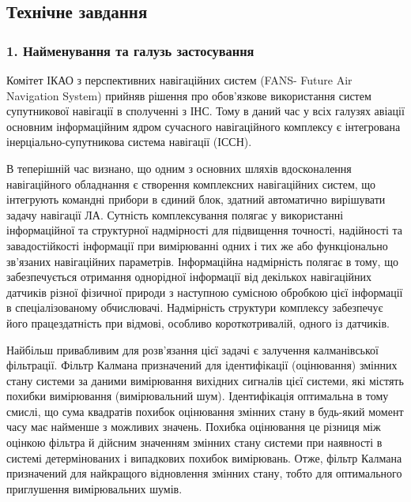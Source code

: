 % 
% 
% 
% 
% 


\subsection*{Технічне завдання}

\subsubsection*{1. Найменування та галузь застосування}
Комітет ІКАО з перспективних навігаційних систем (FANS- Future Air Navigation System) прийняв 
рішення про обов'язкове використання систем супутникової навігації в сполученні з ІНС. Тому в 
даний час у всіх галузях авіації основним інформаційним ядром сучасного навігаційного комплексу 
є інтегрована інерціально-супутникова система навігації (ІССН).

В теперішній час визнано, що одним з основних шляхів вдосконалення навігаційного обладнання 
є створення комплексних навігаційних систем, що інтегрують  командні прибори в єдиний блок, 
здатний автоматично вирішувати задачу навігації ЛА. Сутність комплексування полягає у 
використанні інформаційної та структурної надмірності для підвищення точності, надійності 
та завадостійкості інформації при вимірюванні одних і тих же або функціонально зв’язаних 
навігаційних параметрів. Інформаційна надмірність полягає в тому, що забезпечується отримання 
однорідної інформації від декількох навігаційних датчиків різної фізичної природи з наступною 
сумісною обробкою цієї інформації в спеціалізованому обчислювачі. Надмірність структури 
комплексу забезпечує його працездатність при відмові, особливо короткотривалій, одного із датчиків. 


Найбільш привабливим для розв’язання цієї задачі є залучення калманівської фільтрації. 
Фільтр Калмана призначений для ідентифікації (оцінювання) змінних стану системи за даними 
вимірювання вихідних сигналів цієї системи, які містять похибки вимірювання (вимірювальний шум). 
Ідентифікація оптимальна в тому смислі, що сума квадратів похибок оцінювання змінних стану
в будь-який момент часу має найменше з можливих значень. Похибка оцінювання це різниця 
між оцінкою фільтра й дійсним значенням змінних стану системи при наявності в системі 
детермінованих і випадкових похибок вимірювань. Отже, фільтр Калмана призначений для 
найкращого  відновлення змінних стану, тобто для оптимального приглушення вимірювальних шумів.

